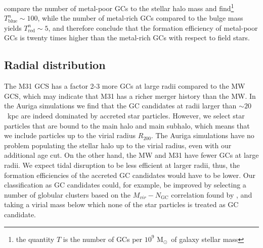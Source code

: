 \documentclass[a4paper,fleqn,usenatbib]{mnras}
\newcommand{\Sun}[0]{\ensuremath{_{\odot}}}
\begin{document}
\citet{2006ARA&A..44..193B} compare the number of metal-poor GCs to the stellar
halo mass and find\footnote{the quantity $T$ is the number of GCs per $10^9$ M\Sun \,
of galaxy stellar mass} $T^n_{\text{blue}} \sim 100$, while the
number of metal-rich GCs compared to the bulge mass yields $T^n_{\text{red}} \sim 5$,
and therefore conclude that the formation efficiency of metal-poor GCs is
twenty times higher than the metal-rich GCs with respect to field stars.



\subsection{Radial distribution}
\label{sec:discussion_Rgc}
The M31 GCS has a factor 2-3 more GCs at large radii compared to the MW GCS,
which may indicate that M31 has a richer merger history than the MW. In the 
Auriga simulations we find that the GC candidates at radii larger than 
$\sim20$~kpc are indeed dominated by accreted star particles. However, we select
star particles that are bound to the main halo and main subhalo, which means that
we include particles up to the virial radius $R_{200}$. The Auriga simulations 
have no problem populating the stellar halo up to the virial radius, even with 
our additional age cut. On the other hand, the MW and M31 have fewer GCs at large
radii. We expect tidal disruption to be less efficient at larger radii, thus, 
the formation efficiencies of the accreted GC candidates would have to be lower.
Our classification as GC candidates could, for example, be improved by selecting
a number of globular clusters based on the $M_{vir}-N_{\text{GC}}$ correlation
found by \citet{2019arXiv190100900B}, and taking a virial mass below which none
of the star particles is treated as GC candidate.

\end{document}
